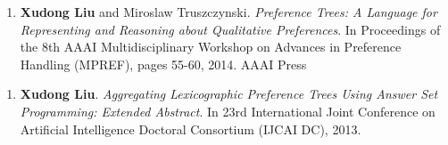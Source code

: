 {}{} \vspace{-0.4cm}
\begin{enumerate}  \itemsep -3pt
	\item \textbf{Xudong Liu} and Miroslaw Truszczynski.
		\textit{Preference Trees: A Language for Representing and Reasoning about Qualitative Preferences}.
		In Proceedings of the 8th AAAI Multidisciplinary Workshop on Advances in Preference 
		Handling (MPREF), pages 55-60, 2014. AAAI Press
\end{enumerate}

{}{} \vspace{-0.4cm}
\begin{enumerate}  \itemsep -3pt
	\item {\bf Xudong Liu}. \textit{Aggregating Lexicographic Preference Trees Using Answer Set Programming: Extended Abstract}. 
In 23rd International Joint Conference on Artificial Intelligence Doctoral Consortium (IJCAI DC), 2013.
\end{enumerate}

\vspace{3pt}


